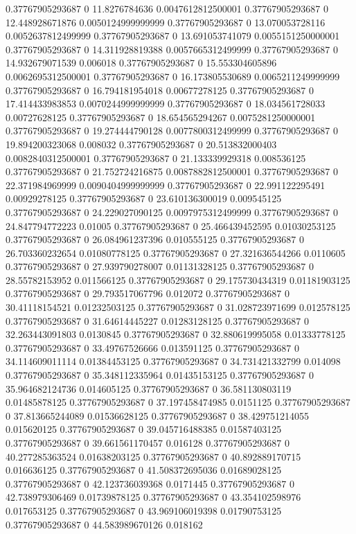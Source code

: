 0.37767905293687 0 11.8276784636 0.0047612812500001
0.37767905293687 0 12.448928671876 0.0050124999999999
0.37767905293687 0 13.070053728116 0.0052637812499999
0.37767905293687 0 13.691053741079 0.0055151250000001
0.37767905293687 0 14.311928819388 0.0057665312499999
0.37767905293687 0 14.932679071539 0.006018
0.37767905293687 0 15.553304605896 0.0062695312500001
0.37767905293687 0 16.173805530689 0.0065211249999999
0.37767905293687 0 16.794181954018 0.00677278125
0.37767905293687 0 17.414433983853 0.0070244999999999
0.37767905293687 0 18.034561728033 0.00727628125
0.37767905293687 0 18.654565294267 0.0075281250000001
0.37767905293687 0 19.274444790128 0.0077800312499999
0.37767905293687 0 19.894200323068 0.008032
0.37767905293687 0 20.513832000403 0.0082840312500001
0.37767905293687 0 21.133339929318 0.008536125
0.37767905293687 0 21.752724216875 0.0087882812500001
0.37767905293687 0 22.371984969999 0.0090404999999999
0.37767905293687 0 22.991122295491 0.00929278125
0.37767905293687 0 23.610136300019 0.009545125
0.37767905293687 0 24.229027090125 0.0097975312499999
0.37767905293687 0 24.847794772223 0.01005
0.37767905293687 0 25.466439452595 0.01030253125
0.37767905293687 0 26.084961237396 0.010555125
0.37767905293687 0 26.703360232654 0.01080778125
0.37767905293687 0 27.321636544266 0.0110605
0.37767905293687 0 27.939790278007 0.01131328125
0.37767905293687 0 28.55782153952 0.011566125
0.37767905293687 0 29.175730434319 0.01181903125
0.37767905293687 0 29.793517067796 0.012072
0.37767905293687 0 30.41118154521 0.01232503125
0.37767905293687 0 31.028723971699 0.012578125
0.37767905293687 0 31.64614445227 0.01283128125
0.37767905293687 0 32.263443091803 0.0130845
0.37767905293687 0 32.880619995058 0.01333778125
0.37767905293687 0 33.49767526666 0.013591125
0.37767905293687 0 34.114609011114 0.01384453125
0.37767905293687 0 34.731421332799 0.014098
0.37767905293687 0 35.348112335964 0.01435153125
0.37767905293687 0 35.964682124736 0.014605125
0.37767905293687 0 36.581130803119 0.01485878125
0.37767905293687 0 37.197458474985 0.0151125
0.37767905293687 0 37.813665244089 0.01536628125
0.37767905293687 0 38.429751214055 0.015620125
0.37767905293687 0 39.045716488385 0.01587403125
0.37767905293687 0 39.661561170457 0.016128
0.37767905293687 0 40.277285363524 0.01638203125
0.37767905293687 0 40.892889170715 0.016636125
0.37767905293687 0 41.508372695036 0.01689028125
0.37767905293687 0 42.123736039368 0.0171445
0.37767905293687 0 42.738979306469 0.01739878125
0.37767905293687 0 43.354102598976 0.017653125
0.37767905293687 0 43.969106019398 0.01790753125
0.37767905293687 0 44.583989670126 0.018162
